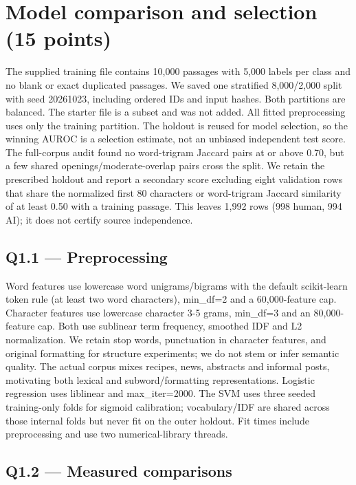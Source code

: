 \section{Model comparison and selection (15 points)}

The supplied training file contains 10,000 passages with 5,000 labels per class and no blank or exact duplicated passages. We saved one stratified 8,000/2,000 split with seed 20261023, including ordered IDs and input hashes. Both partitions are balanced. The starter file is a subset and was not added. All fitted preprocessing uses only the training partition. The holdout is reused for model selection, so the winning AUROC is a selection estimate, not an unbiased independent test score. The full-corpus audit found no word-trigram Jaccard pairs at or above 0.70, but a few shared openings/moderate-overlap pairs cross the split. We retain the prescribed holdout and report a secondary score excluding eight validation rows that share the normalized first 80 characters or word-trigram Jaccard similarity of at least 0.50 with a training passage. This leaves 1,992 rows (998 human, 994 AI); it does not certify source independence.

\subsection*{Q1.1 --- Preprocessing}

Word features use lowercase word unigrams/bigrams with the default scikit-learn token rule (at least two word characters), min\_df=2 and a 60,000-feature cap. Character features use lowercase character 3-5 grams, min\_df=3 and an 80,000-feature cap. Both use sublinear term frequency, smoothed IDF and L2 normalization. We retain stop words, punctuation in character features, and original formatting for structure experiments; we do not stem or infer semantic quality. The actual corpus mixes recipes, news, abstracts and informal posts, motivating both lexical and subword/formatting representations. Logistic regression uses liblinear and max\_iter=2000. The SVM uses three seeded training-only folds for sigmoid calibration; vocabulary/IDF are shared across those internal folds but never fit on the outer holdout. Fit times include preprocessing and use two numerical-library threads.

\subsection*{Q1.2 --- Measured comparisons}

